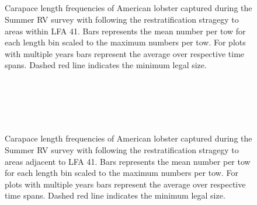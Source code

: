 \documentclass[11pt]{article}
\newcommand{\D}{.}
\newcommand{\e}{/backup/bio_data/bio.lobster/figures/} %
\begin{document}
\begin{figure}
\centering

\\
\\
\\
\\
 \caption{Carapace length frequencies of American lobster captured during the Summer RV survey with following the restratification stragegy to areas within LFA 41. Bars represents the mean number per tow for each length bin scaled to the maximum numbers per tow. For plots with multiple years bars represent the average over respective time spans. Dashed red line indicates the minimum legal size.}
\end{figure}
\clearpage


\begin{figure}
\centering

\\
\\
\\
\\
 \caption{Carapace length frequencies of American lobster captured during the Summer RV survey with following the restratification stragegy to areas adjacent to LFA 41. Bars represents the mean number per tow for each length bin scaled to the maximum numbers per tow. For plots with multiple years bars represent the average over respective time spans. Dashed red line indicates the minimum legal size.}
\end{figure}
\clearpage
\end{document}

